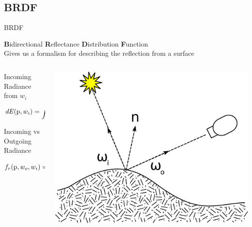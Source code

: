 \documentclass[10pt,compress,professionalfont]{beamer}
\begin{document}
\subsection{BRDF}
\begin{frame}{BRDF}

    {\centering
        {\bf B}idirectional {\bf R}eflectance {\bf D}istribution {\bf F}unction\\
        \vspace{4mm}
        Gives us a formalism for describing the reflection from a surface\\
    }

    \begin{columns}
        \begin{column}{0.55\textwidth}

            \begin{block}{Incoming Radiance from $w_i$}
            \[
                \mathit{dE}(\textup{p}, w_i) = \int\mathit{L_i}(\textup{p} \leftarrow w_i)\textup{cos}\theta_i dw_i.
            \]
            \end{block}
            \begin{block}{Incoming vs Outgoing Radiance}
            \[
                f_r(\textup{p}, w_o, w_i) =  \frac{dL_o(\textup{p},w_o)}{dE(\textup{p},w_i)}
            \]
            \end{block}

        \end{column}
        \begin{column}{0.45\textwidth}
            \vspace{10mm}
            \includegraphics[width=\textwidth]{../img/external/BRDF_Diagram.pdf}\\
        \end{column}
    \end{columns}
\end{frame}
\end{document}
